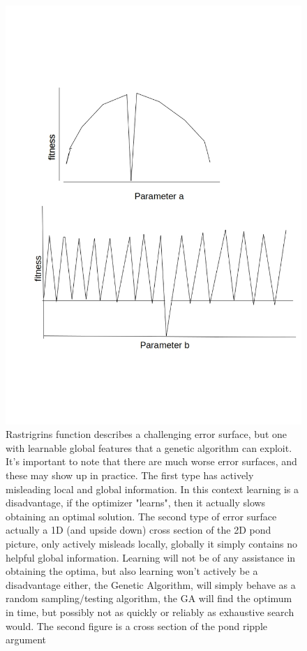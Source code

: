 \begin{figure}
\centering
      \label{fig:test1}
      \centering
      \includegraphics[scale=0.85]{figures/worst_error_surfaces.jpg}
      \caption[Something]{Rastrigrins function describes a challenging error surface, but one with learnable global features that a genetic algorithm can exploit. It's important to note that there are much worse error surfaces, and these may show up in practice. The first type has actively misleading local and global information. In this context learning is a disadvantage, if the optimizer "learns", then it actually slows obtaining an optimal solution. The second type of error surface actually a 1D (and upside down) cross section of the 2D pond picture, only actively misleads locally, globally it simply contains no helpful global information. Learning will not be of any assistance in obtaining the optima, but also learning won't actively be a disadvantage either, the Genetic Algorithm, will simply behave as a random sampling/testing algorithm, the GA will find the optimum in time, but possibly not as quickly or reliably as exhaustive search would. The second figure is a cross section of the pond ripple argument}
      \label{fig:test2}
\end{figure}

